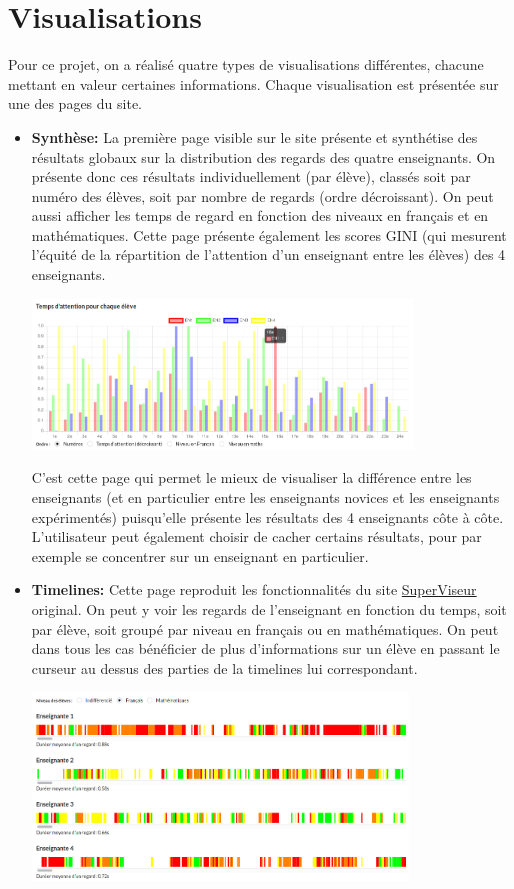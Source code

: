 \documentclass{article}
\begin{document}
\section{Visualisations}
Pour ce projet, on a réalisé quatre types de visualisations différentes, chacune mettant en valeur certaines informations. Chaque visualisation est présentée sur une des pages du site.
\begin{itemize}
    \item \textbf{Synthèse:} La première page visible sur le site présente et synthétise des résultats globaux sur la distribution des regards des quatre enseignants. On présente donc ces résultats individuellement (par élève), classés soit par numéro des élèves, soit par nombre de regards (ordre décroissant). On peut aussi afficher les temps de regard en fonction des niveaux en français et en mathématiques. Cette page présente également les scores GINI (qui mesurent l'équité de la répartition de l'attention d'un enseignant entre les élèves) des 4 enseignants. 
        \begin{center}
            \includegraphics[height=4cm]{resume.png}
        \end{center}
        C'est cette page qui permet le mieux de visualiser la différence entre les enseignants (et en particulier entre les enseignants novices et les enseignants expérimentés) puisqu'elle présente les résultats des 4 enseignants côte à côte. L'utilisateur peut également choisir de cacher certains résultats, pour par exemple se concentrer sur un enseignant en particulier.\\
    \item \textbf{Timelines:} Cette page reproduit les fonctionnalités du site \href{http://superviseur.lip6.fr/}{SuperViseur} original. On peut y voir les regards de l'enseignant en fonction du temps, soit par élève, soit groupé par niveau en français ou en mathématiques. On peut dans tous les cas bénéficier de plus d'informations sur un élève en passant le curseur au dessus des parties de la timelines lui correspondant. 
        \begin{center}
            \includegraphics[height=5cm]{timelines.png}

\end{center}
\end{itemize}
\end{document}
